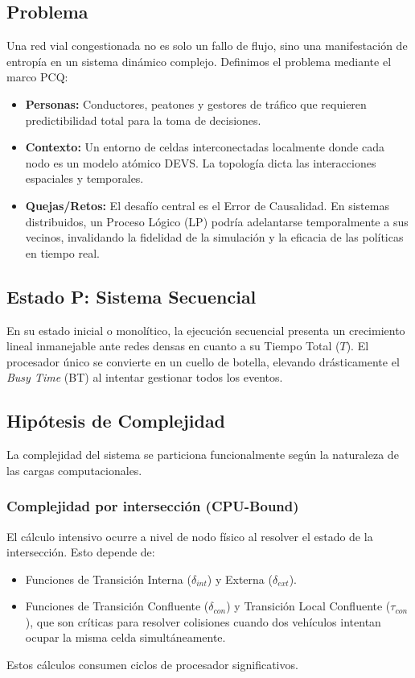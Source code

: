 \documentclass[12pt]{article}
\begin{document}
\subsection{Problema}

Una red vial congestionada no es solo un fallo de flujo, sino una manifestación de entropía en un sistema dinámico complejo. Definimos el problema mediante el marco PCQ:

\begin{itemize}
    \item \textbf{Personas:} Conductores, peatones y gestores de tráfico que requieren predictibilidad total para la toma de decisiones.
    \item \textbf{Contexto:} Un entorno de celdas interconectadas localmente donde cada nodo es un modelo atómico DEVS. La topología dicta las interacciones espaciales y temporales.
    \item \textbf{Quejas/Retos:} El desafío central es el Error de Causalidad. En sistemas distribuidos, un Proceso Lógico (LP) podría adelantarse temporalmente a sus vecinos, invalidando la fidelidad de la simulación y la eficacia de las políticas en tiempo real.
\end{itemize}

\subsection{Estado P: Sistema Secuencial}
En su estado inicial o monolítico, la ejecución secuencial presenta un crecimiento lineal inmanejable ante redes densas en cuanto a su Tiempo Total ($T$). El procesador único se convierte en un cuello de botella, elevando drásticamente el \textit{Busy Time} (BT) al intentar gestionar todos los eventos.

\subsection{Hipótesis de Complejidad}
La complejidad del sistema se particiona funcionalmente según la naturaleza de las cargas computacionales.

\subsubsection{Complejidad por intersección (CPU-Bound)}
El cálculo intensivo ocurre a nivel de nodo físico al resolver el estado de la intersección. Esto depende de:
\begin{itemize}
    \item Funciones de Transición Interna ($\delta_{int}$) y Externa ($\delta_{ext}$).
    \item Funciones de Transición Confluente ($\delta_{con}$) y Transición Local Confluente ($\tau_{con}$), que son críticas para resolver colisiones cuando dos vehículos intentan ocupar la misma celda simultáneamente.
\end{itemize}
Estos cálculos consumen ciclos de procesador significativos.
\end{document}
